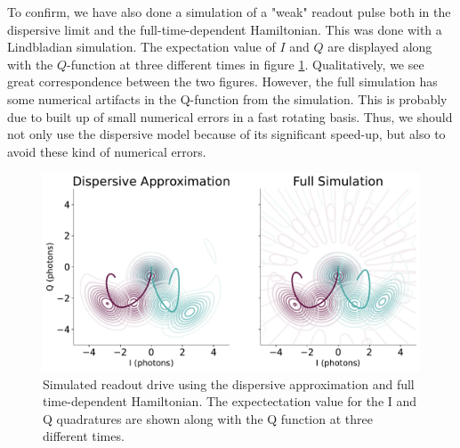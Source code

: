 To confirm, we have also done a simulation of a "weak" readout pulse both in the dispersive limit and the full-time-dependent Hamiltonian. This was done with a Lindbladian simulation. The expectation value of $I$ and $Q$ are displayed along with the $Q$-function at three different times in figure \ref{fig:dispersive_slash_full_readout}. Qualitatively, we see great correspondence between the two figures. However, the full simulation has some numerical artifacts in the Q-function from the simulation. This is probably due to built up of small numerical errors in a fast rotating basis. Thus, we should not only use the dispersive model because of its significant speed-up, but also to avoid these kind of numerical errors.

\begin{figure}
    \centering
    \includegraphics[width = \textwidth]{Simulations/readout_simulations/figures/dispersive_approx.pdf}
    \caption{Simulated readout drive using the dispersive approximation and full time-dependent Hamiltonian. The expectectation value for the I and Q quadratures are shown along with the Q function at three different times.}
    \label{fig:dispersive_slash_full_readout}
\end{figure}



